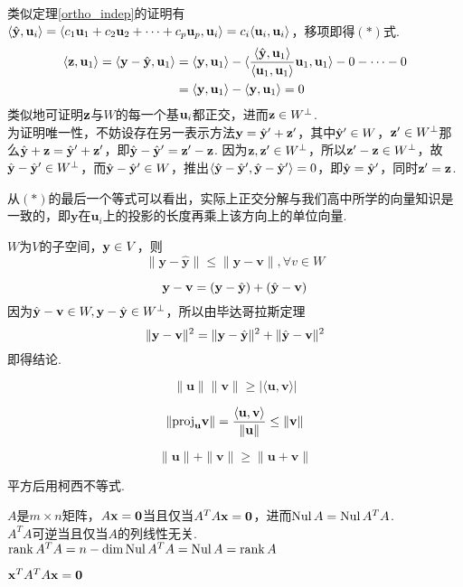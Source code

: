 \begin{analysis}
类似定理\ref{ortho_indep}的证明有$\langle \hat{\mathbf{y}},\mathbf{u}_i \rangle=\langle c_1\mathbf{u}_1+c_2\mathbf{u}_2+\cdots+c_p\mathbf{u}_p,\mathbf{u}_i \rangle=c_i\langle \mathbf{u}_i,\mathbf{u}_i \rangle$，移项即得$(*)$式.
\[\begin{aligned}\langle \mathbf{z},\mathbf{u}_1 \rangle=\langle \mathbf{y}-\hat{\mathbf{y}},\mathbf{u}_1 \rangle&=\langle \mathbf{y},\mathbf{u}_1 \rangle-\langle \frac{\langle \hat{\mathbf{y}},\mathbf{u}_1\rangle}{\langle\mathbf{u}_1,\mathbf{u}_1\rangle}\mathbf{u}_1,\mathbf{u}_1 \rangle-0-\cdots-0\\
&=\langle \mathbf{y},\mathbf{u}_1 \rangle-\langle \mathbf{y},\mathbf{u}_1 \rangle=0\end{aligned}\]
类似地可证明$\mathbf{z}$与$W$的每一个基$\mathbf{u}_i$都正交，进而$\mathbf{z}\in W^\perp$.\\
为证明唯一性，不妨设存在另一表示方法$\mathbf{y}=\hat{\mathbf{y}}'+\mathbf{z'}$，其中$\hat{\mathbf{y}}'\in W$，$\mathbf{z'}\in W^\perp$那么$\hat{\mathbf{y}}+\mathbf{z}=\hat{\mathbf{y}}'+\mathbf{z'}$，即$\hat{\mathbf{y}}-\hat{\mathbf{y}}'=\mathbf{z'}-\mathbf{z}$. 因为$\mathbf{z},\mathbf{z'}\in W^\perp$，所以$\mathbf{z'}-\mathbf{z}\in W^\perp$，故$\hat{\mathbf{y}}-\hat{\mathbf{y}}'\in W^\perp$，而$\hat{\mathbf{y}}-\hat{\mathbf{y}}'\in W$，推出$\langle \hat{\mathbf{y}}-\hat{\mathbf{y}}',\hat{\mathbf{y}}-\hat{\mathbf{y}}' \rangle=0$，即$\hat{\mathbf{y}}=\hat{\mathbf{y}}'$，同时$\mathbf{z'}=\mathbf{z}$.
\end{analysis}
\par 从$(*)$的最后一个等式可以看出，实际上正交分解与我们高中所学的向量知识是一致的，即$\mathbf{y}$在$\mathbf{u}_i$上的投影的长度再乘上该方向上的单位向量.
\begin{theorem}[最佳估计]
$W$为$V$的子空间，$\mathbf{y}\in V$，则
\[\|\mathbf{y}-\hat{\mathbf{y}}\|\leq\|\mathbf{y}-\mathbf{v}\|,\forall v\in W\]
\end{theorem}
\begin{analysis}
\[\mathbf{y}-\mathbf{v}=(\mathbf{y}-\hat{\mathbf{y}})+(\hat{\mathbf{y}}-\mathbf{v})\]
因为$\hat{\mathbf{y}}-\mathbf{v}\in W,\mathbf{y}-\hat{\mathbf{y}}\in W^\perp$，所以由毕达哥拉斯定理
\[\|\mathbf{y}-\mathbf{v}\|^2=\|\mathbf{y}-\hat{\mathbf{y}}\|^2+\|\hat{\mathbf{y}}-\mathbf{v}\|^2\]
即得结论.
\end{analysis}
\begin{theorem}
\[\|\mathbf{u}\|\|\mathbf{v}\|\geq|\langle \mathbf{u},\mathbf{v} \rangle|\]
\end{theorem}
\begin{analysis}
\[\|\mathrm{proj}_{\mathbf{u}}\mathbf{v}\|=\dfrac{\langle \mathbf{u},\mathbf{v} \rangle}{\|\mathbf{u}\|}\leq\|\mathbf{v}\|\]
\end{analysis}
\begin{theorem}[三角不等式]
\[\|\mathbf{u}\|+\|\mathbf{v}\|\geq\|\mathbf{u}+\mathbf{v}\|\]
\end{theorem}
\begin{analysis}
平方后用柯西不等式.
\end{analysis}
\begin{proposition}%
$A$是$m\times n$矩阵，$A\mathbf{x}=\mathbf{0}$当且仅当$A^TA\mathbf{x}=\mathbf{0}$，进而$\mathrm{Nul}\, A=\mathrm{Nul}\, A^TA$.\\
$A^TA$可逆当且仅当$A$的列线性无关. $\mathrm{rank}\, A^TA=n-\mathrm{dim}\,\mathrm{Nul}\, A^TA=\mathrm{Nul}\, A=\mathrm{rank}\, A$
\end{proposition}
\begin{analysis}
$\mathbf{x}^TA^TA\mathbf{x}=\mathbf{0}$
\end{analysis}

